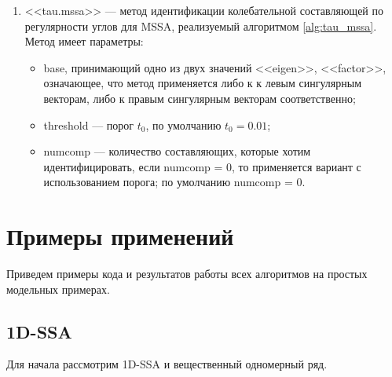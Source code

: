 \documentclass[specialist,
               substylefile = spbu.rtx,
               subf,href,colorlinks=true, 12pt]{disser}
\begin{document}
\begin{enumerate}
\begin{itemize}
\end{itemize} 
\item <<tau.mssa>> --- метод идентификации колебательной составляющей по регулярности углов для MSSA, реализуемый алгоритмом \ref{alg:tau_mssa}. Метод имеет параметры:
\begin{itemize}
\item base, принимающий одно из двух значений  <<eigen>>, <<factor>>, означающее, что метод применяется либо к  к левым сингулярным векторам, либо к правым сингулярным векторам соответственно;
\item threshold --- порог $t_0$, по умолчанию $t_0=0.01$;
\item numcomp --- количество составляющих, которые хотим идентифицировать, если numcomp = 0, то применяется вариант с использованием порога; по умолчанию numcomp = 0.
\end{itemize} 
\end{enumerate}

\section{Примеры применений}
Приведем примеры кода и результатов работы всех алгоритмов на простых модельных примерах.

\subsection{1D-SSA}
Для начала рассмотрим 1D-SSA и вещественный одномерный ряд.
\end{document}
